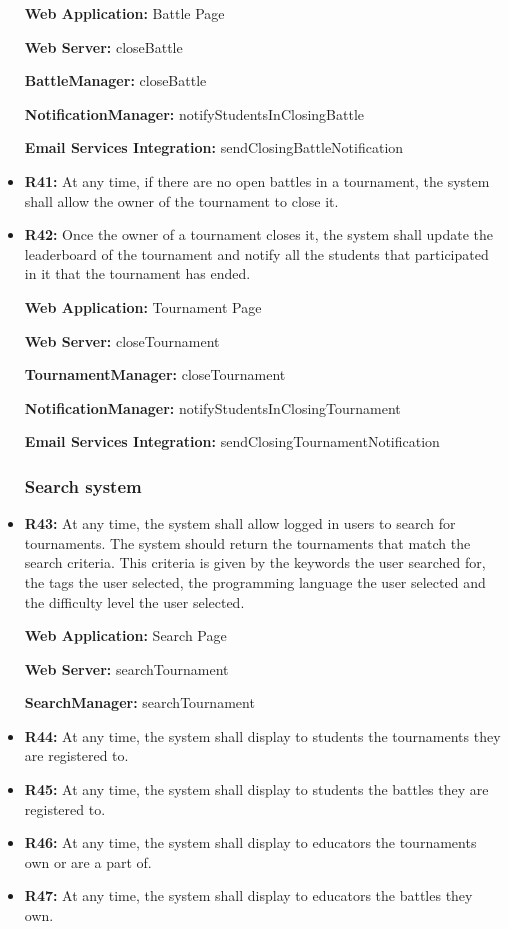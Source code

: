 \documentclass{article}
\begin{document}
\begin{itemize}
    \textbf{Web Application:} Battle Page

    \textbf{Web Server:} closeBattle

    \textbf{BattleManager:} closeBattle

    \textbf{NotificationManager:} notifyStudentsInClosingBattle

    \textbf{Email Services Integration:} sendClosingBattleNotification

    \item \textbf{R41:} At any time, if there are no open battles in a tournament, the system shall allow the owner of the tournament to close it.
    \item \textbf{R42:} Once the owner of a tournament closes it, the system shall update the leaderboard of the tournament and notify all the students that participated in it that the tournament has ended.
    
    \textbf{Web Application:} Tournament Page

    \textbf{Web Server:} closeTournament

    \textbf{TournamentManager:} closeTournament

    \textbf{NotificationManager:} notifyStudentsInClosingTournament

    \textbf{Email Services Integration:} sendClosingTournamentNotification

    \subsubsection*{Search system}

    \item \textbf{R43:} At any time, the system shall allow logged in users to search for tournaments. The system should return the tournaments that match the search criteria. This criteria is given by the keywords the user searched for, the tags the user selected, the programming language the user selected and the difficulty level the user selected.
    
    \textbf{Web Application:} Search Page

    \textbf{Web Server:} searchTournament

    \textbf{SearchManager:} searchTournament
    
    \item \textbf{R44:} At any time, the system shall display to students the tournaments they are registered to.
    \item \textbf{R45:} At any time, the system shall display to students the battles they are registered to.
    \item \textbf{R46:} At any time, the system shall display to educators the tournaments own or are a part of.
    \item \textbf{R47:} At any time, the system shall display to educators the battles they own.
    

\end{itemize}
\end{document}
